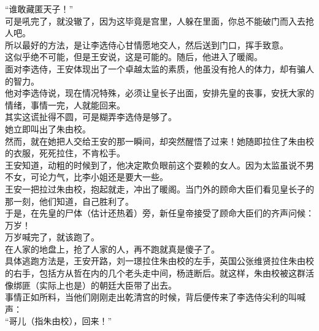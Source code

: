 \begin{multicols}{\theparacolNo}
“谁敢藏匿天子！”\\

可是吼完了，就没辙了，因为这毕竟是宫里，人躲在里面，你总不能破门而入去抢人吧。\\

所以最好的方法，是让李选侍心甘情愿地交人，然后送到门口，挥手致意。\\

这似乎绝不可能，但是王安说，这是可能的。随后，他进入了暖阁。\\

面对李选侍，王安体现出了一个卓越太监的素质，他虽没有抢人的体力，却有骗人的智力。\\

他对李选侍说，现在情况特殊，必须让皇长子出面，安排先皇的丧事，安抚大家的情绪，事情一完，人就能回来。\\

其实这谎扯得不圆，可是糊弄李选侍是够了。\\

她立即叫出了朱由校。\\

然而，就在她把人交给王安的那一瞬间，却突然醒悟了过来！她随即拉住了朱由校的衣服，死死拉住，不肯松手。\\

王安知道，动粗的时候到了，他决定欺负眼前这个耍赖的女人。因为太监虽说不男不女，可论力气，比李小姐还是要大一些。\\

王安一把拉过朱由校，抱起就走，冲出了暖阁。当门外的顾命大臣们看见皇长子的那一刻，他们知道，自己胜利了。\\

于是，在先皇的尸体（估计还热着）旁，新任皇帝接受了顾命大臣们的齐声问候：万岁！\\

万岁喊完了，就该跑了。\\

在人家的地盘上，抢了人家的人，再不跑就真是傻子了。\\

具体逃跑方法是，王安开路，刘一璟拉住朱由校的左手，英国公张维贤拉住朱由校的右手，包括方从哲在内的几个老头走中间，杨涟断后。就这样，朱由校被这群活像绑匪（实际上也是）的朝廷大臣带了出去。\\

事情正如所料，当他们刚刚走出乾清宫的时候，背后便传来了李选侍尖利的叫喊声：\\

“哥儿（指朱由校），回来！”\\


\end{multicols}
